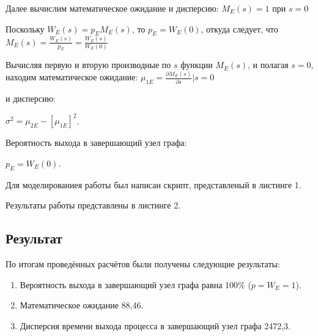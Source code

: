 Далее вычислим математическое ожидание и дисперсию: $M_E(s) = 1$ при $s=0$

Поскольку $W_E(s)=p_E M_E (s)$,  то  $p_E=W_E(0)$,  откуда следует, что $M_E(s)=\frac{W_E(s)}{p_E} =\frac{W_E(s)}{W_E(0)}$

Вычисляя первую и вторую производные по $s$ функции $M_E(s)$, и полагая $s=0$, находим математическое ожидание:
$\mu_{1E}=\frac{\partial M_E(s)}{\partial s}|s=0$

и дисперсию:

$\sigma^2=\mu_{2E}-[\mu_{1E}]^2$.

Вероятность выхода в завершающий узел графа:

$p_E=W_E (0)$.

Для моделированиея работы был написан скрипт, представленый в листинге 1.




Результаты работы представлены в листинге 2.



\subsection{Результат}

По итогам проведённых расчётов были получены следующие результаты:
\begin{enumerate}
	\item Вероятность выхода в завершающий узел графа равна 100\% ($p=W_E=1$).
	\item Математическое ожидание 88,46.
	\item Дисперсия времени выхода процесса в завершающий узел графа 2472,3.
\end{enumerate}
